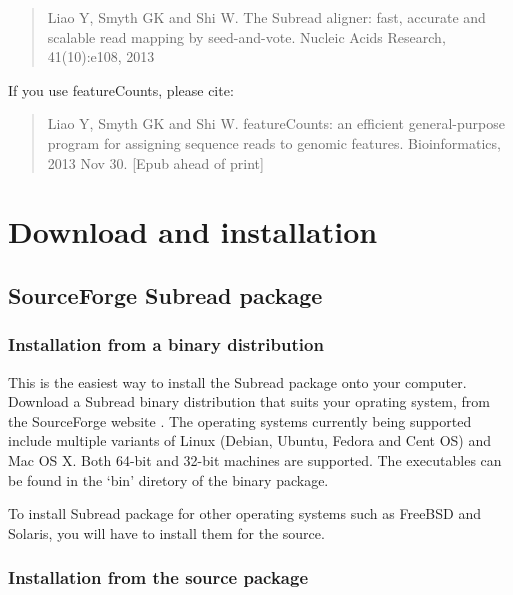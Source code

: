 \documentclass[12pt]{report}
\newcommand{\Subread}{\textsf{Subread}}
\newcommand{\featureCounts}{\textsf{featureCounts}}
\begin{document}
\begin{quote}
Liao Y, Smyth GK and Shi W. The Subread aligner: fast, accurate and scalable read mapping by seed-and-vote. Nucleic Acids Research, 41(10):e108, 2013
\\
{ }
\end{quote}

If you use \featureCounts, please cite:\\
\begin{quote}
Liao Y, Smyth GK and Shi W. featureCounts: an efficient general-purpose program for assigning sequence reads to genomic features. Bioinformatics, 2013 Nov 30. [Epub ahead of print]
\\
{}
\end{quote}


\section{Download and installation}

\subsection{SourceForge {\Subread} package}

\subsubsection{Installation from a binary distribution}

This is the easiest way to install the {\Subread} package onto your computer.
Download a {\Subread} binary distribution that suits your oprating system, from the SourceForge website {}. The operating systems currently being supported include multiple variants of Linux (Debian, Ubuntu, Fedora and Cent OS) and Mac OS X. Both 64-bit and 32-bit machines are supported. The executables can be found in the `bin' diretory of the binary package.

To install {\Subread} package for other operating systems such as FreeBSD and Solaris, you will have to install them for the source.


\subsubsection{Installation from the source package}
\end{document}
